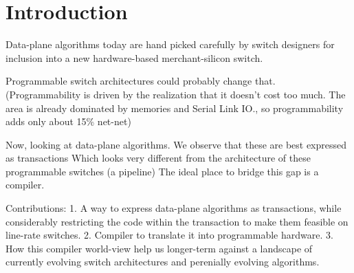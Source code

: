 \section{Introduction}
\label{s:intro}
Data-plane algorithms today are hand picked carefully by switch designers for
inclusion into a new hardware-based merchant-silicon switch.

Programmable switch architectures could probably change that.
(Programmability is driven by the realization that it doesn't cost
too much. The area is already dominated by memories and Serial Link IO., so
programmability adds only about 15\% net-net)

Now, looking at data-plane algorithms. We observe that these are best expressed as transactions
Which looks very different from the architecture of these programmable switches (a pipeline)
The ideal place to bridge this gap is a compiler.

Contributions:
1. A way to express data-plane algorithms as transactions, while considerably restricting the code within the transaction to make them feasible on line-rate switches.
2. Compiler to translate it into programmable hardware.
3. How this compiler world-view help us longer-term against a landscape of currently evolving switch architectures and perenially evolving algorithms.
